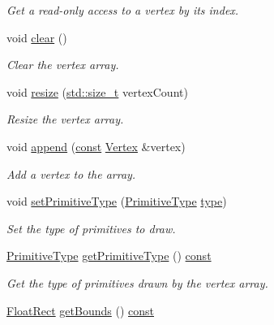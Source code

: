 \begin{DoxyCompactItemize}
\begin{DoxyCompactList}\small\item\em Get a read-\/only access to a vertex by its index. \end{DoxyCompactList}\item 
void \hyperlink{classsf_1_1_vertex_array_a3654c424aca1f9e468f369bc777c839c}{clear} ()
\begin{DoxyCompactList}\small\item\em Clear the vertex array. \end{DoxyCompactList}\item 
void \hyperlink{classsf_1_1_vertex_array_a0c0fe239e8f9a54e64d3bbc96bf548c0}{resize} (\hyperlink{nc__alloc_8h_a7b60c5629e55e8ec87a4547dd4abced4}{std\-::size\-\_\-t} vertex\-Count)
\begin{DoxyCompactList}\small\item\em Resize the vertex array. \end{DoxyCompactList}\item 
void \hyperlink{classsf_1_1_vertex_array_a80c8f6865e53bd21fc6cb10fffa10035}{append} (\hyperlink{term__entry_8h_a57bd63ce7f9a353488880e3de6692d5a}{const} \hyperlink{classsf_1_1_vertex}{Vertex} \&vertex)
\begin{DoxyCompactList}\small\item\em Add a vertex to the array. \end{DoxyCompactList}\item 
void \hyperlink{classsf_1_1_vertex_array_aa38c10707c28a97f4627ae8b2f3ad969}{set\-Primitive\-Type} (\hyperlink{group__graphics_ga5ee56ac1339984909610713096283b1b}{Primitive\-Type} \hyperlink{_entity_8cpp_aa209819775142a76b8e49319d79ecab2}{type})
\begin{DoxyCompactList}\small\item\em Set the type of primitives to draw. \end{DoxyCompactList}\item 
\hyperlink{group__graphics_ga5ee56ac1339984909610713096283b1b}{Primitive\-Type} \hyperlink{classsf_1_1_vertex_array_af2205f76fe98fb3cf1f303f25d43c045}{get\-Primitive\-Type} () \hyperlink{term__entry_8h_a57bd63ce7f9a353488880e3de6692d5a}{const} 
\begin{DoxyCompactList}\small\item\em Get the type of primitives drawn by the vertex array. \end{DoxyCompactList}\item 
\hyperlink{namespacesf_ab0d978f5903922a6bdfca1736b71ccc9}{Float\-Rect} \hyperlink{classsf_1_1_vertex_array_a741d1b1acbb175289eab37bbf49cbb24}{get\-Bounds} () \hyperlink{term__entry_8h_a57bd63ce7f9a353488880e3de6692d5a}{const} 

\end{DoxyCompactItemize}
